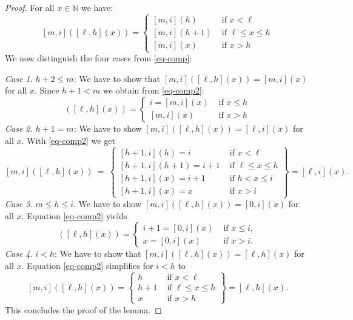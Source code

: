 \documentclass[a4paper,UKenglish,cleveref, autoref, thm-restate, numberwithinsect]{lipics-v2021}
\begin{document}
\begin{proof}
For all $x \in \mathbb{N}$ we have:
\begin{equation} \label{eq-comp2}
[m,i]([\ell,h](x)) = \begin{cases}
[m,i](h) & \text{ if } x < \ell \\
[m,i](h+1) & \text{ if } \ell \le x \le h  \\ 
[m,i](x) & \text{ if } x > h  
\end{cases}
\end{equation}
We now distinguish the four cases from \eqref{eq-comp}:

\medskip
\noindent
\emph{Case 1.} $h+2 \leq m$: We have to show that $[m,i]([\ell,h](x)) = [m,i](x)$ for all $x$.
Since $h+1 < m$ we obtain from \eqref{eq-comp2}:
\begin{equation*} 
[m,i]([\ell,h](x)) = \begin{cases}
i = [m,i](x) & \text{ if } x \le h \\
[m,i](x) & \text{ if } x > h  
\end{cases}
\end{equation*}
\emph{Case 2.} $h+1 = m$: We have to show $[m,i]([\ell,h](x)) = [\ell,i](x)$ for all $x$.
With  \eqref{eq-comp2} we get
\begin{equation*} 
\left.
[m,i]([\ell,h](x)) \ = \ \begin{cases}
[h+1,i](h) = i & \text{ if } x < \ell \\
[h+1,i](h+1) = i+1& \text{ if } \ell \le x \le h  \\ 
[h+1,i](x) = i+1 & \text{ if } h < x \leq i \\
[h+1,i](x) = x & \text{ if } x > i
\end{cases}
 \right\} = [\ell,i](x).
\end{equation*}
\emph{Case 3.} $m \le h \leq i$. We have to show $[m,i]([\ell,h](x)) = [0,i](x)$ for all $x$.
Equation  \eqref{eq-comp2} yields
\begin{equation*} 
[m,i]([\ell,h](x)) = \begin{cases}
i+1 = [0,i](x)& \text{ if } x \le i, \\
x = [0,i](x) & \text{ if } x > i.
\end{cases}
\end{equation*}
\emph{Case 4.} $i < h$:  We have to show that $[m,i]([\ell,h](x)) = [\ell,h](x)$ for all $x$.
Equation \eqref{eq-comp2} simplifies for $i < h$ to
\begin{equation*} 
\left.
[m,i]([\ell,h](x)) = \begin{cases}
h & \text{ if } x < \ell \\
h+1 & \text{ if } \ell \le x \le h \\ 
x & \text{ if } x > h
\end{cases}
 \right\} = [\ell,h](x) .
\end{equation*}
This concludes the proof of the lemma.
\end{proof}
\end{document}
